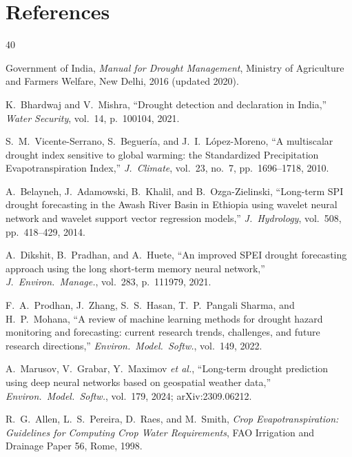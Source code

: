 \documentclass[11pt,a4paper,oneside]{article}
\begin{document}
\section{References}
\begingroup
\small
\setlength{\parskip}{0pt}
\renewcommand{\section}[2]{}
\begin{thebibliography}{40}
\setlength{\itemsep}{0pt}
\setlength{\parsep}{0pt}

 Government of India, \textit{Manual for Drought Management}, Ministry of Agriculture and Farmers Welfare, New Delhi, 2016 (updated 2020).

 K.~Bhardwaj and V.~Mishra, ``Drought detection and declaration in India,'' \textit{Water Security}, vol.~14, p.~100104, 2021.

 S.~M.~Vicente-Serrano, S.~Beguer\'{i}a, and J.~I.~L\'{o}pez-Moreno, ``A multiscalar drought index sensitive to global warming: the Standardized Precipitation Evapotranspiration Index,'' \textit{J.\ Climate}, vol.~23, no.~7, pp.~1696--1718, 2010.

 A.~Belayneh, J.~Adamowski, B.~Khalil, and B.~Ozga-Zielinski, ``Long-term SPI drought forecasting in the Awash River Basin in Ethiopia using wavelet neural network and wavelet support vector regression models,'' \textit{J.\ Hydrology}, vol.~508, pp.~418--429, 2014.

 A.~Dikshit, B.~Pradhan, and A.~Huete, ``An improved SPEI drought forecasting approach using the long short-term memory neural network,'' \textit{J.\ Environ.\ Manage.}, vol.~283, p.~111979, 2021.

 F.~A.~Prodhan, J.~Zhang, S.~S.~Hasan, T.~P.~Pangali Sharma, and H.~P.~Mohana, ``A review of machine learning methods for drought hazard monitoring and forecasting: current research trends, challenges, and future research directions,'' \textit{Environ.\ Model.\ Softw.}, vol.~149, 2022.

 A.~Marusov, V.~Grabar, Y.~Maximov \textit{et al.}, ``Long-term drought prediction using deep neural networks based on geospatial weather data,'' \textit{Environ.\ Model.\ Softw.}, vol.~179, 2024; arXiv:2309.06212.

 R.~G.~Allen, L.~S.~Pereira, D.~Raes, and M.~Smith, \textit{Crop Evapotranspiration: Guidelines for Computing Crop Water Requirements}, FAO Irrigation and Drainage Paper 56, Rome, 1998.


\end{thebibliography}
\end{document}
